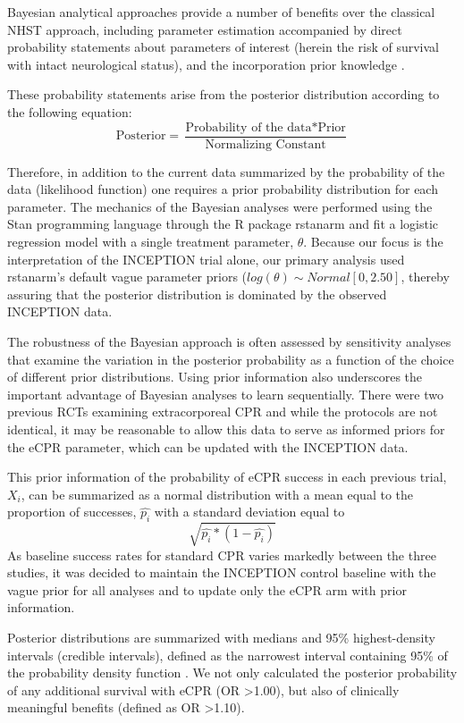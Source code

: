 \documentclass[
  super,
  preprint,
  3p]{elsarticle}
\begin{document}
Bayesian analytical approaches provide a number of benefits over the
classical NHST approach, including parameter estimation accompanied by
direct probability statements about parameters of interest (herein the
risk of survival with intact neurological status), and the incorporation
prior knowledge \citep{BrophyCardio, Zampieri}.

These probability statements arise from the posterior distribution
according to the following equation:
\[ \text{Posterior}  = \frac{\text{Probability of the data} * \text{Prior}}{\text{Normalizing Constant}} \]

Therefore, in addition to the current data summarized by the probability
of the data (likelihood function) one requires a prior probability
distribution for each parameter. The mechanics of the Bayesian analyses
were performed using the Stan programming language \citep{stan} through
the R package rstanarm \citep{rstanarm} and fit a logistic regression
model with a single treatment parameter, \(\theta\). Because our focus
is the interpretation of the INCEPTION trial alone, our primary analysis
used rstanarm's default vague parameter priors
(\(log(\theta) \sim Normal [0, 2.50]\), thereby assuring that the
posterior distribution is dominated by the observed INCEPTION data.

The robustness of the Bayesian approach is often assessed by sensitivity
analyses that examine the variation in the posterior probability as a
function of the choice of different prior distributions. Using prior
information also underscores the important advantage of Bayesian
analyses to learn sequentially. There were two previous RCTs examining
extracorporeal CPR\citep{RN6759, RN6751} and while the protocols are not
identical, it may be reasonable to allow this data to serve as informed
priors for the eCPR parameter, which can be updated with the INCEPTION
data.

This prior information of the probability of eCPR success in each
previous trial, \(X_i\), can be summarized as a normal distribution with
a mean equal to the proportion of successes, \(\hat{p_i}\) with a
standard deviation equal to \[\sqrt{\hat{p_i}*(1-\hat{p_i})}\] As
baseline success rates for standard CPR varies markedly between the
three studies, it was decided to maintain the INCEPTION control baseline
with the vague prior for all analyses and to update only the eCPR arm
with prior information.

Posterior distributions are summarized with medians and 95\%
highest-density intervals (credible intervals), defined as the narrowest
interval containing 95\% of the probability density function
\citep{mcelreath2020}. We not only calculated the posterior probability
of any additional survival with eCPR (OR \textgreater1.00), but also of
clinically meaningful benefits (defined as OR \textgreater1.10).
\end{document}
